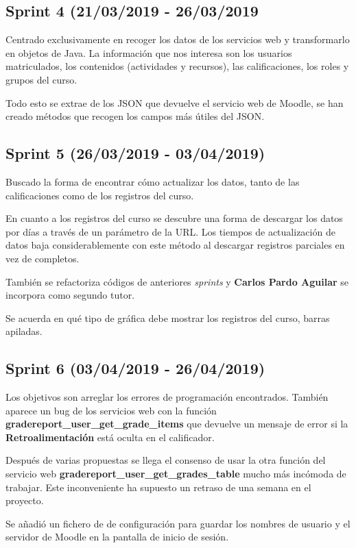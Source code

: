 \subsection{Sprint 4 (21/03/2019 - 26/03/2019}

Centrado exclusivamente en recoger los datos de los servicios web y transformarlo en objetos de Java. La información que nos interesa son los usuarios matriculados, los contenidos (actividades y recursos), las calificaciones, los roles y grupos del curso.

Todo esto se extrae de los JSON que devuelve el servicio web de Moodle, se han creado métodos que recogen los campos más útiles del JSON.

\subsection{Sprint 5 (26/03/2019 - 03/04/2019)}

Buscado la forma de encontrar cómo actualizar los datos, tanto de las calificaciones como de los registros del curso.

En cuanto a los registros del curso se descubre una forma de descargar los datos por días a través de un parámetro de la URL. Los tiempos de actualización de datos baja considerablemente con este método al descargar registros parciales en vez de completos.

También se refactoriza códigos de anteriores \textit{sprints} y \textbf{Carlos Pardo Aguilar} se incorpora como segundo tutor.

Se acuerda en qué tipo de gráfica debe mostrar los registros del curso, barras apiladas.

\subsection{Sprint 6 (03/04/2019 - 26/04/2019)}

Los objetivos son arreglar los errores de programación encontrados. También aparece un bug de los servicios web con la función \textbf{gradereport\_user\_get\_grade\_items} que devuelve un mensaje de error si la \textbf{Retroalimentación} está oculta en el calificador.

Después de varias propuestas se llega el consenso de usar la otra función 
del servicio web \textbf{gradereport\_user\_get\_grades\_table} mucho más incómoda de trabajar. Este inconveniente ha supuesto un retraso de una semana en el proyecto.

Se añadió un fichero de de configuración para guardar los nombres de usuario y el servidor de Moodle en la pantalla de inicio de sesión.

